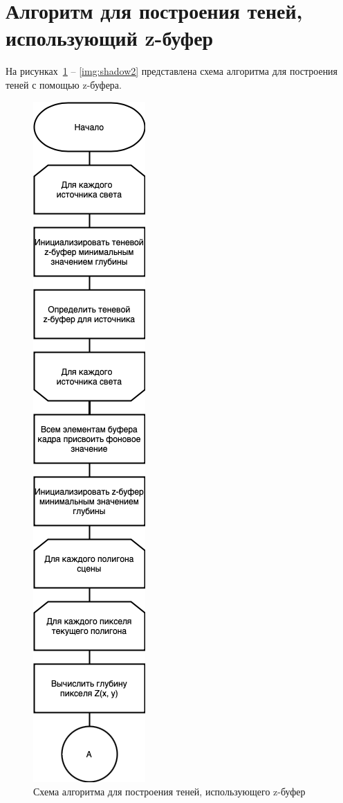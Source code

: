 \clearpage

\section{Алгоритм для построения теней, использующий z-буфер}

На рисунках~\ref{img:shadow1} -- \ref{img:shadow2} представлена схема алгоритма для построения теней с помощью z-буфера.

\begin{figure}[h]
    \centering
    \includegraphics[width=0.23\linewidth]{img/shadow1.png}
    \caption{Схема алгоритма для построения теней, использующего z-буфер}
    \label{img:shadow1}
\end{figure}
\noindent

